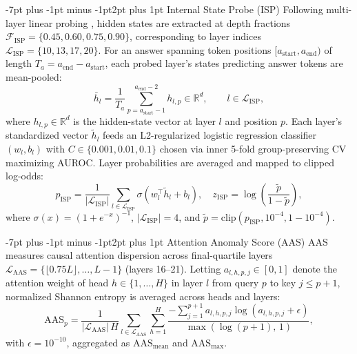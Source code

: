 \documentclass[10pt,twocolumn,letterpaper]{article}
\makeatletter
\renewcommand{\subsection}{\@startsection{subsection}{2}{\z@}%
  {-7pt plus -1pt minus -1pt}{2pt plus 1pt}%
  {\normalfont\normalsize\itshape\color{black}}}
\makeatother
\begin{document}
\subsection{Internal State Probe (ISP)}
Following multi-layer linear probing \cite{review27}, hidden states are extracted at depth fractions $\mathcal{F}_{\text{ISP}} = \{0.45, 0.60, 0.75, 0.90\}$, corresponding to layer indices $\mathcal{L}_{\text{ISP}} = \{10, 13, 17, 20\}$. For an answer spanning token positions $[a_{\text{start}}, a_{\text{end}})$ of length $T_a = a_{\text{end}} - a_{\text{start}}$, each probed layer's states predicting answer tokens are mean-pooled:
\begin{equation}
\bar{h}_l = \frac{1}{T_a} \sum_{p = a_{\text{start}} - 1}^{a_{\text{end}} - 2} h_{l,p} \in \mathbb{R}^{d}, \qquad l \in \mathcal{L}_{\text{ISP}},
\label{eq:isp_mean}
\end{equation}
where $h_{l,p} \in \mathbb{R}^{d}$ is the hidden-state vector at layer $l$ and position $p$. Each layer's standardized vector $\tilde{h}_l$ feeds an L2-regularized logistic regression classifier $(w_l, b_l)$ with $C \in \{0.001, 0.01, 0.1\}$ chosen via inner 5-fold group-preserving CV maximizing AUROC. Layer probabilities are averaged and mapped to clipped log-odds:
\begin{equation}
p_{\text{ISP}} = \frac{1}{|\mathcal{L}_{\text{ISP}}|} \sum_{l \in \mathcal{L}_{\text{ISP}}} \sigma\!\left(w_l^\top \tilde{h}_l + b_l\right), \quad z_{\text{ISP}} = \log\!\left(\frac{\tilde{p}}{1 - \tilde{p}}\right),
\label{eq:isp_prob}
\end{equation}
where $\sigma(x) = (1 + e^{-x})^{-1}$, $|\mathcal{L}_{\text{ISP}}| = 4$, and $\tilde{p} = \text{clip}(p_{\text{ISP}}, 10^{-4}, 1 - 10^{-4})$.

\subsection{Attention Anomaly Score (AAS)}
AAS measures causal attention dispersion across final-quartile layers $\mathcal{L}_{\text{AAS}} = \{\lfloor 0.75 L \rfloor, \dots, L - 1\}$ (layers 16--21). Letting $a_{l,h,p,j} \in [0, 1]$ denote the attention weight of head $h \in \{1, \dots, H\}$ in layer $l$ from query $p$ to key $j \le p + 1$, normalized Shannon entropy is averaged across heads and layers:
\begin{equation}
\text{AAS}_p = \frac{1}{|\mathcal{L}_{\text{AAS}}|\, H} \sum_{l \in \mathcal{L}_{\text{AAS}}} \sum_{h=1}^{H} \frac{-\sum_{j=1}^{p+1} a_{l,h,p,j} \log\!\left(a_{l,h,p,j} + \epsilon\right)}{\max(\log(p+1),\, 1)},
\label{eq:aas}
\end{equation}
with $\epsilon = 10^{-10}$, aggregated as $\text{AAS}_{\text{mean}}$ and $\text{AAS}_{\text{max}}$.
\end{document}
